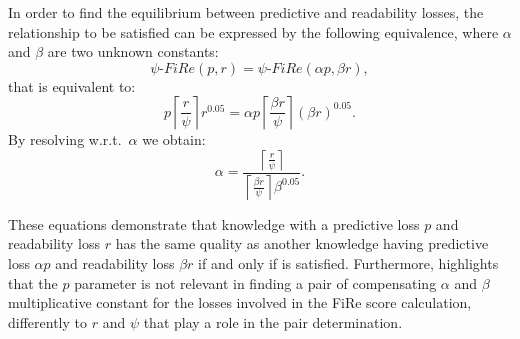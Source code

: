 \documentclass{article}
\newcommand{\fire}{FiRe}
\begin{document}
In order to find the equilibrium between predictive and readability losses, the relationship to be satisfied can be expressed by the following equivalence, where $\alpha$ and $\beta$ are two unknown constants:
%
\begin{equation}\label{eq:equi1}
	\psi\textrm{-}\fire(p, r) = \psi\textrm{-}\fire(\alpha p, \beta r),
\end{equation}
%
that is equivalent to:
%
\begin{equation}\label{eq:equi2}
	p \left \lceil{\frac{r}{\psi}}\right \rceil r^{0.05} = \alpha p \left \lceil{\frac{\beta r}{\psi}}\right \rceil (\beta r)^{0.05}.
\end{equation}
%
By resolving w.r.t.\ $\alpha$ we obtain:
%
\begin{equation}\label{eq:alpha}
	\alpha = \frac{\left \lceil{\frac{r}{\psi}}\right \rceil}{\left \lceil{\frac{\beta r}{\psi}}\right \rceil \beta^{0.05}}.
\end{equation}


These equations demonstrate that knowledge with a predictive loss $p$ and readability loss $r$ has the same quality as another knowledge having predictive loss $\alpha p$ and readability loss $\beta r$ if and only if  is satisfied.
%
Furthermore,  highlights that the $p$ parameter is not relevant in finding a pair of compensating $\alpha$ and $\beta$ multiplicative constant for the losses involved in the \fire{} score calculation, differently to $r$ and $\psi$ that play a role in the pair determination.
\end{document}
